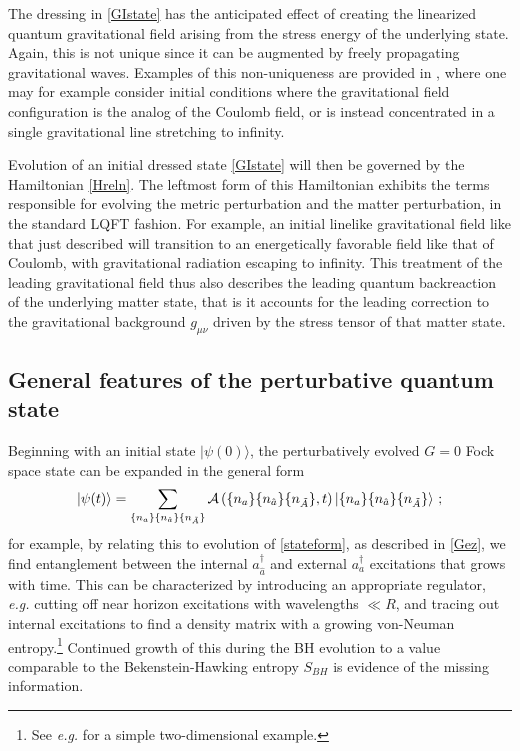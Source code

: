 \documentclass[12pt]{article}
\numberwithin{equation}{section}
\newcommand{\cala}{{\cal A}}
\newcommand{\beq}{\begin{equation}}
\newcommand{\eeq}{\end{equation}}
\begin{document}
The dressing in \eqref{GIstate} has the anticipated effect of creating the linearized quantum gravitational field arising from the stress energy of the underlying state.  Again, this is not unique since it can be augmented by freely propagating gravitational waves.  Examples of this non-uniqueness are provided in \cite{DoGi1}, where one may for example consider initial conditions where the gravitational field configuration is the analog of the Coulomb field, or is instead concentrated in a single gravitational line stretching to infinity.

Evolution of an initial dressed state \eqref{GIstate} will then be governed by the Hamiltonian \eqref{Hreln}.  The leftmost form of this Hamiltonian exhibits the terms responsible for evolving the metric perturbation and the matter perturbation, in the standard LQFT fashion.  For example, an initial linelike gravitational field like that just described will transition to an energetically favorable field like that of Coulomb, with gravitational radiation escaping to infinity.  This treatment of the leading gravitational field thus also describes the leading quantum backreaction of the underlying matter state, that is it accounts for the leading correction to the gravitational background $g_{\mu\nu}$ driven by the stress tensor of that matter state.



\subsection{General features of the perturbative quantum state}

Beginning with an initial state $|\psi(0)\rangle$, the perturbatively evolved $G=0$ Fock space state can be expanded in the general form 
\beq \label{matstate}
|\psi(t)\rangle = \sum_{\{n_a\}\{n_{\hat a}\}\{n_{\tilde A}\}} \cala\left({\{n_a\}\{n_{\hat a}\}\{n_{\tilde A}\}},t\right)|{\{n_a\}\{n_{\hat a}\}\{n_{\tilde A}\}}\rangle\ ;
\eeq
for example, by relating this to evolution of \eqref{stateform}, as described in \ref{Gez}, we find entanglement between the internal $a^\dagger_{\hat a}$ and external 
$a^\dagger_{a}$ excitations that grows with time.  This can be characterized by introducing an appropriate regulator, {\it e.g.} cutting off near horizon excitations with wavelengths $\ll R$, and tracing out internal excitations to find a density matrix with a growing von-Neuman entropy.\footnote{See {\it e.g.} \cite{GiNe} for a simple two-dimensional example.}  Continued growth of this during the BH evolution to a value comparable to the Bekenstein-Hawking entropy $S_{BH}$ is evidence of the missing information.
\end{document}
